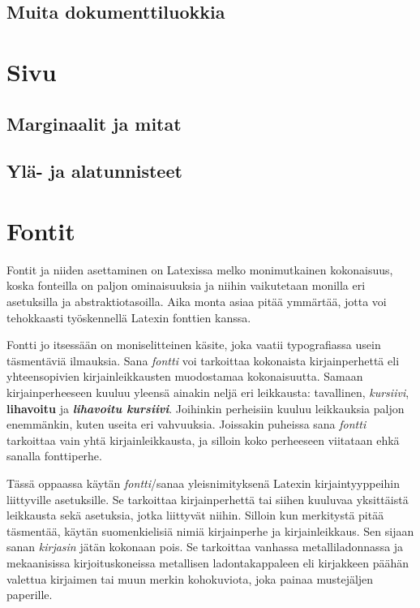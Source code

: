 \subsection{Muita dokumenttiluokkia}

\section{Sivu}
\label{luku:sivuasetukset}
\subsection{Marginaalit ja mitat}
\subsection{Ylä- ja alatunnisteet}

\section{Fontit}
\label{luku:kirjaintyypit}

Fontit ja niiden asettaminen on Latexissa melko monimutkainen
kokonaisuus, koska fonteilla on paljon ominaisuuksia ja niihin
vaikutetaan monilla eri asetuksilla ja abstraktiotasoilla. Aika monta
asiaa pitää ymmärtää, jotta voi tehokkaasti työskennellä Latexin
fonttien kanssa.

Fontti jo itsessään on moniselitteinen käsite, joka vaatii typografiassa
usein täsmentäviä ilmauksia. Sana \emph{fontti} voi tarkoittaa
kokonaista kirjainperhettä eli yhteensopivien kirjainleikkausten
muodostamaa kokonaisuutta. Samaan kirjainperheeseen kuuluu yleensä
ainakin neljä eri leikkausta: tavallinen, \textit{kursiivi},
\textbf{lihavoitu} ja \textbf{\textit{lihavoitu kursiivi}}. Joihinkin
perheisiin kuuluu leikkauksia paljon enemmänkin, kuten useita eri
vahvuuksia. Joissakin puheissa sana \emph{fontti} tarkoittaa vain yhtä
kirjainleikkausta, ja silloin koko perheeseen viitataan ehkä sanalla
fonttiperhe.

Tässä oppaassa käytän \emph{fontti}\-/sanaa yleisnimityksenä Latexin
kirjaintyyppeihin liittyville asetuksille. Se tarkoittaa kirjainperhettä
tai siihen kuuluvaa yksittäistä leikkausta sekä asetuksia, jotka
liittyvät niihin. Silloin kun merkitystä pitää täsmentää, käytän
suomenkielisiä nimiä kirjainperhe ja kirjainleikkaus. Sen sijaan sanan
\emph{kirjasin} jätän kokonaan pois. Se tarkoittaa vanhassa
metalliladonnassa ja mekaanisissa kirjoituskoneissa metallisen
ladontakappaleen eli kirjakkeen päähän valettua kirjaimen tai muun
merkin kohokuviota, joka painaa mustejäljen paperille.

